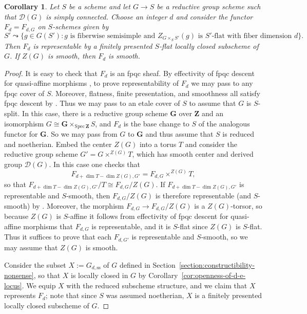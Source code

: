 \documentclass[11pt,reqno]{amsart}
\newtheorem{cor}[theorem]{Corollary}
\theoremstyle{definition}
\renewcommand{\rm}{\mathrm}
\newcommand{\Spec}{\mathrm{Spec} \,}
\newcommand{\bG}{{\mathbf G}}
\newcommand{\bZ}{{\mathbf Z}}
\newcommand{\sD}{{\mathscr D}}
\begin{document}
\begin{cor}\label{cor:scheme-of-d-regular-elements}
Let $S$ be a scheme and let $G \to S$ be a reductive group scheme such that $\sD(G)$ is simply connected. Choose an integer $d$ and consider the functor $F_d = F_{d, G}$ on $S$-schemes given by
\[
S' \leadsto \{g \in G(S'): g \text{ is fiberwise semisimple and } Z_{G \times_S S'}(g) \text{ is $S'$-flat with fiber dimension $d$}\}.
\]
Then $F_d$ is representable by a finitely presented $S$-flat locally closed subscheme of $G$. If $Z(G)$ is smooth, then $F_d$ is smooth.
\end{cor}

\begin{proof}
It is easy to check that $F_d$ is an fpqc sheaf. By effectivity of fpqc descent for quasi-affine morphisms \cite[Exp.\ VIII, Cor.\ 7.9]{SGA1}, to prove representability of $F_d$ we may pass to any fpqc cover of $S$. Moreover, flatness, finite presentation, and smoothness all satisfy fpqc descent by \cite[IV\textsubscript{2}, Props.\ 2.5.1 and 2.7.1(vi); IV\textsubscript{4}, Cor.\ 17.7.3(ii)]{EGA}. Thus we may pass to an etale cover of $S$ to assume that $G$ is $S$-split. In this case, there is a reductive group scheme $\bG$ over $\bZ$ and an isomorphism $G \cong \bG \times_{\Spec \bZ} S$, and $F_d$ is the base change to $S$ of the analogous functor for $\bG$. So we may pass from $G$ to $\bG$ and thus assume that $S$ is reduced and noetherian. Embed the center $Z(G)$ into a torus $T$ and consider the reductive group scheme $G' = G \times^{Z(G)} T$, which has smooth center and derived group $\sD(G)$. In this case one checks that
\[
F_{d + \dim T - \dim Z(G), G'} = F_{d, G} \times^{Z(G)} T,
\]
so that $F_{d + \dim T - \dim Z(G), G'}/T \cong F_{d, G}/Z(G)$. If $F_{d + \dim T - \dim Z(G), G'}$ is representable and $S$-smooth, then $F_{d, G}/Z(G)$ is therefore representable (and $S$-smooth) by \cite[Exp.\ VIII, Thm.\ 5.1; Exp.\ IX, Prop.\ 2.3]{SGA3}. Moreover, the morphism $F_{d, G} \to F_{d, G}/Z(G)$ is a $Z(G)$-torsor, so because $Z(G)$ is $S$-affine it follows from effectivity of fpqc descent for quasi-affine morphisms that $F_{d, G}$ is representable, and it is $S$-flat since $Z(G)$ is $S$-flat. Thus it suffices to prove that each $F_{d, G'}$ is representable and $S$-smooth, so we may assume that $Z(G)$ is smooth. \smallskip

Consider the subset $X := G_{d, \rm{ss}}$ of $G$ defined in Section~\ref{section:constructibility-nonsense}, so that $X$ is locally closed in $G$ by Corollary~\ref{cor:openness-of-d-e-locus}. We equip $X$ with the reduced subscheme structure, and we claim that $X$ represents $F_d$; note that since $S$ was assumed noetherian, $X$ is a finitely presented locally closed subscheme of $G$. \smallskip


\end{proof}
\end{document}
